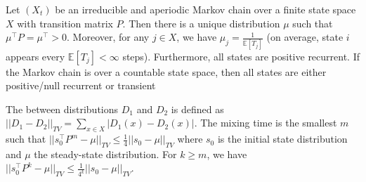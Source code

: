 \begin{thm}
Let $(X_t)$ be an irreducible and aperiodic Markov chain over a finite state space $X$ with transition matrix $P$. Then there is a unique distribution $\mu$ such that $\mu^\top P = \mu^\top > 0$. Moreover, for any $j \in X$, we have $\mu_j = \frac{1}{\mathbb{E}[T_j]}$ (on average, state $i$ appears every $\mathbb{E}[T_j] < \infty$ steps). Furthermore, all states are positive recurrent. If the Markov chain is over a countable state space, then all states are either positive/null recurrent or transient\end{thm}

\begin{deff}
The  between distributions $D_1$ and $D_2$ is defined as $||D_1 - D_2||_{TV} = \sum_{x \in X} |D_1(x) - D_2(x)|$.
The mixing time is the smallest $m$ such that $||s_0^\top P^m - \mu||_{TV} \leq \frac{1}{4} ||s_0 - \mu||_{TV}$ where $s_0$ is the initial state distribution and $\mu$ the steady-state distribution. For $k \geq m$, we have $||s_0^\top P^k - \mu||_{TV} \leq \frac{1}{4^k} ||s_0 - \mu||_{TV}$.\end{deff}

